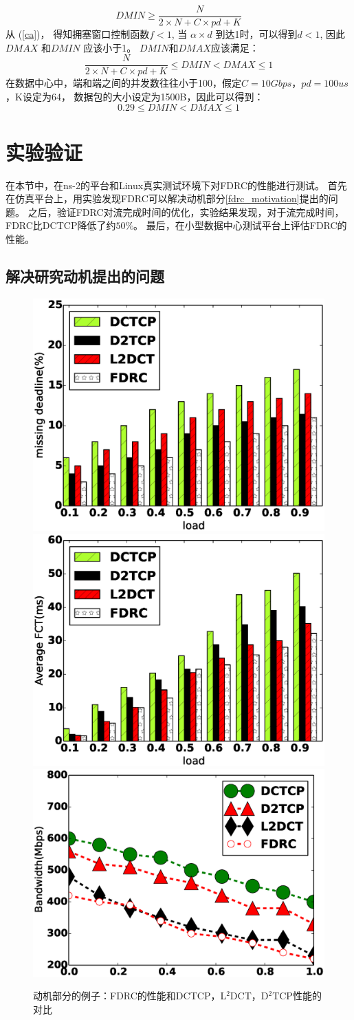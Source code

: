 \begin{equation}
\label{DMAXvalue}
DMIN \ge \frac{N}{2\times N +C \times pd +K}
\end{equation}
从 (\ref{ca})， 得知拥塞窗口控制函数$f<1$, 当 $\alpha \times d$ 到达1时，可以得到$d<1$,
因此$DMAX$ 和$DMIN$ 应该小于1。
$DMIN$和$DMAX$应该满足：
\begin{equation}
\label{DMAXDMIN}
\frac{N}{2\times N +C \times pd +K} \le DMIN < DMAX \le1
\end{equation}
在数据中心中，端和端之间的并发数往往小于100\cite{DCTCP}，假定$C=10Gbps$，$pd=100us$，K设定为64，
数据包的大小设定为1500B，因此可以得到：
\begin{equation}
\label{DMAX_DMIN_RANGE}
0.29 \le DMIN < DMAX \le1
\end{equation}





\section{实验验证}
在本节中，在ns-2的平台和Linux真实测试环境下对FDRC的性能进行测试。
首先在仿真平台上，用实验发现FDRC可以解决动机部分\ref{fdrc_motivation}提出的问题。
之后，验证FDRC对流完成时间的优化，实验结果发现，对于流完成时间，FDRC比DCTCP降低了约$50\%$。
最后，在小型数据中心测试平台上评估FDRC的性能。

\subsection{解决研究动机提出的问题}
\begin{figure}[h]
\centering
{}
 {\includegraphics[width=0.32\columnwidth]{figures/FDRC/evaluation/spineleaf/miss_deadline.eps}}
{\includegraphics[width=0.32\columnwidth]{figures/FDRC/evaluation/spineleaf/fct2.eps}}
{\includegraphics[width=0.32\columnwidth]{figures/FDRC/evaluation/spineleaf/bandwidth.eps}}
\caption{动机部分的例子：FDRC的性能和DCTCP，L$^2$DCT，D$^2$TCP性能的对比}
\label{fdrc-motivation-resolved-fig}
\end{figure}



